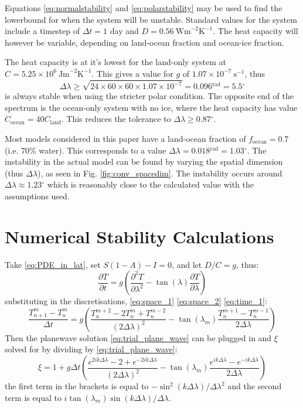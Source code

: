 \documentclass[12pt, onecolumn]{revtex4-2}    %
\newcommand{\heatcap}{\ensuremath{\ \text{Jm}^{-2} \text{K}^{-1}}}
\newcommand{\diffusion}{\ensuremath{\ \text{Wm}^{-2} \text{K}^{-1}}}
\newcommand{\radians}{\ensuremath{^{\text{rad}}}}
\newcommand{\degrees}{\ensuremath{^{\circ}}}
\begin{document}
Equations \eqref{eq:normalstability} and \eqref{eq:polarstability} may be used to find the lowerbound for when the system will be unstable.
Standard values for the system include a timestep of $\Delta t = 1$ day and $D = 0.56 \diffusion$.
The heat capacity will however be variable, depending on land-ocean fraction and ocean-ice fraction.

The heat capacity is at it's lowest for the land-only system at $C=5.25\times10^6 \heatcap$.
This gives a value for $g$ of $1.07\times10^{-7} \ \text{s}^{-1}$, thus
\begin{equation*}
    \Delta\lambda \ge \sqrt{24\times60\times60\times1.07\times10^{-7}} = 0.096\radians = 5.5\degrees
\end{equation*}
is always stable when using the stricter polar condition.
The opposite end of the spectrum is the ocean-only system with no ice, where the heat capacity has value $C_{\text{ocean}} = 40 C_{\text{land}}$.
This reduces the tolerance to $\Delta\lambda \ge 0.87 \degrees$.

Most models considered in this paper have a land-ocean fraction of $f_{\text{ocean}} = 0.7$ (i.e. 70\% water).
This corresponds to a value $\Delta\lambda = 0.018\radians = 1.03\degrees$.
The instability in the actual model can be found by varying the spatial dimension (thus $\Delta \lambda$), as seen in Fig. \ref{fig:conv_spacedim}.
The instability occurs around $\Delta\lambda \approx 1.23\degrees$ which is reasonably close to the calculated value with the assumptions used.

\section{Numerical Stability Calculations} \label{app:numstabworkings}

Take \eqref{eq:PDE_in_lat}, set $S(1-A) - I = 0$,
and let $D / C = g$, thus:
\begin{equation*}
    \frac{\partial T}{\partial t} = g \left(\frac{\partial^2 T}{\partial \lambda^2} - \tan(\lambda)\frac{\partial T}{\partial \lambda}\right)
\end{equation*}
substituting in the discretisations, \eqref{eq:space_1} \eqref{eq:space_2} \eqref{eq:time_1}:
\begin{equation*}
    \frac{T^m_{n+1}-T^m_n}{\Delta t} = g \left(\frac{T^{m+2}_{n} - 2T^{m}_{n} + T^{m-2}_{n}}{(2\Delta \lambda)^2} - \tan(\lambda_m)\frac{T^{m+1}_{n} - T^{m-1}_{n}}{2 \Delta \lambda}\right)
\end{equation*}
Then the planewave solution \eqref{eq:trial_plane_wave} can be plugged in and $\xi$ solved for by dividing by \eqref{eq:trial_plane_wave}:
\begin{equation*}
    \xi = 1 + g \Delta t \left( \frac{e^{2ik\Delta\lambda} - 2 + e^{-2ik\Delta\lambda}}{(2\Delta\lambda)^2} - \tan(\lambda_m) \frac{e^{ik\Delta\lambda} - e^{-ik\Delta\lambda}}{2\Delta\lambda} \right)
\end{equation*}
the first term in the brackets is equal to $-\sin^2(k\Delta\lambda) / \Delta\lambda^2$ and the second term is equal to $i\tan(\lambda_m)\sin(k\Delta\lambda) / \Delta\lambda$.
\end{document}
